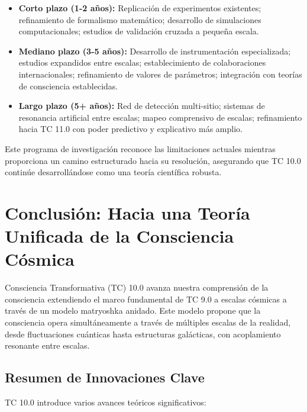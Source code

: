\documentclass[12pt]{article}
\begin{document}
\begin{itemize}
    \item \textbf{Corto plazo (1-2 años):} Replicación de experimentos existentes; refinamiento de formalismo matemático; desarrollo de simulaciones computacionales; estudios de validación cruzada a pequeña escala.
    
    \item \textbf{Mediano plazo (3-5 años):} Desarrollo de instrumentación especializada; estudios expandidos entre escalas; establecimiento de colaboraciones internacionales; refinamiento de valores de parámetros; integración con teorías de consciencia establecidas.
    
    \item \textbf{Largo plazo (5+ años):} Red de detección multi-sitio; sistemas de resonancia artificial entre escalas; mapeo comprensivo de escalas; refinamiento hacia TC 11.0 con poder predictivo y explicativo más amplio.
\end{itemize}

Este programa de investigación reconoce las limitaciones actuales mientras proporciona un camino estructurado hacia su resolución, asegurando que TC 10.0 continúe desarrollándose como una teoría científica robusta.

\section{Conclusión: Hacia una Teoría Unificada de la Consciencia Cósmica}

Consciencia Transformativa (TC) 10.0 avanza nuestra comprensión de la consciencia extendiendo el marco fundamental de TC 9.0 a escalas cósmicas a través de un modelo matryoshka anidado. Este modelo propone que la consciencia opera simultáneamente a través de múltiples escalas de la realidad, desde fluctuaciones cuánticas hasta estructuras galácticas, con acoplamiento resonante entre escalas.

\subsection{Resumen de Innovaciones Clave}

TC 10.0 introduce varios avances teóricos significativos:
\end{document}
